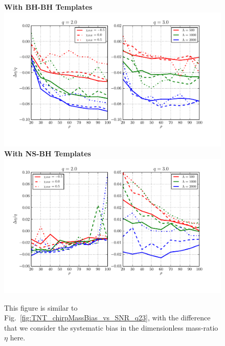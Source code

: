 \documentclass[aps,prd,amsmath,floats,floatfix, twocolumn,
superscriptaddress,nofootinbib,showpacs]{revtex4-1}
\begin{document}
\begin{figure}[h]
\centering    
\textbf{With BH-BH Templates}
\includegraphics[width=2\columnwidth]{plots/TN_EtaBias_vs_SNR_q23.pdf}\\ 
\textbf{With NS-BH Templates}
\includegraphics[width=2\columnwidth]{plots/TT_EtaBias_vs_SNR_q23.pdf}%
\caption{This figure is similar to Fig.~\ref{fig:TNT_chirpMassBias_vs_SNR_q23},
with the difference that we consider the systematic bias in the dimensionless
mass-ratio $\eta$ here.}
\label{fig:TNT_EtaBias_vs_SNR_q23}
\end{figure}
% 
\end{document}
